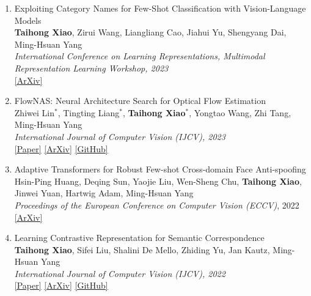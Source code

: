\documentclass[letterpaper]{article}
\begin{document}
\begin{enumerate}


\item Exploiting Category Names for Few-Shot Classification with Vision-Language Models \\
	{\bf Taihong Xiao}, Zirui Wang, Liangliang Cao, Jiahui Yu, Shengyang Dai, Ming-Hsuan Yang \\
	{\it International Conference on Learning Representations, Multimodal Representation Learning Workshop, 2023} \\
	\href{https://arxiv.org/abs/2211.16594}{[ArXiv]}

	
\item FlowNAS: Neural Architecture Search for Optical Flow Estimation \\
	Zhiwei Lin$^*$, Tingting Liang$^*$, {\bf Taihong Xiao}$^*$, Yongtao Wang, Zhi Tang, Ming-Hsuan Yang \\
	{\it International Journal of Computer Vision (IJCV), 2023}  \\
	\href{https://link.springer.com/article/10.1007/s11263-023-01920-9}{[Paper]}	
	\href{https://arxiv.org/abs/2207.01271}{[ArXiv]}
	\href{https://github.com/VDIGPKU/FlowNAS}{[GitHub]}
	
\item Adaptive Transformers for Robust Few-shot Cross-domain Face Anti-spoofing \\
	Hsin-Ping Huang, Deqing Sun, Yaojie Liu, Wen-Sheng Chu, {\bf Taihong Xiao}, Jinwei Yuan, Hartwig Adam, Ming-Hsuan Yang \\
	{\it Proceedings of the European Conference on Computer Vision (ECCV)}, 2022 \\
	\href{https://arxiv.org/abs/2203.12175}{[ArXiv]}
	
\item Learning Contrastive Representation for Semantic Correspondence \\
	{\bf Taihong Xiao}, Sifei Liu, Shalini De Mello, Zhiding Yu, Jan Kautz, Ming-Hsuan Yang \\
	{\it International Journal of Computer Vision (IJCV), 2022} \\
	\href{https://link.springer.com/article/10.1007/s11263-022-01602-y}{[Paper]}
	\href{https://arxiv.org/abs/2109.10967}{[ArXiv]}
	\href{https://github.com/NVlabs/contrastive-correspondence}{[GitHub]}


\end{enumerate}
\end{document}
